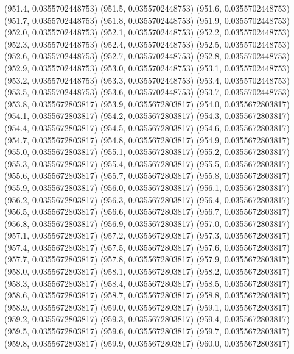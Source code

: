 {					(951.4, 0.0355702448753)
					(951.5, 0.0355702448753)
					(951.6, 0.0355702448753)
					(951.7, 0.0355702448753)
					(951.8, 0.0355702448753)
					(951.9, 0.0355702448753)
					(952.0, 0.0355702448753)
					(952.1, 0.0355702448753)
					(952.2, 0.0355702448753)
					(952.3, 0.0355702448753)
					(952.4, 0.0355702448753)
					(952.5, 0.0355702448753)
					(952.6, 0.0355702448753)
					(952.7, 0.0355702448753)
					(952.8, 0.0355702448753)
					(952.9, 0.0355702448753)
					(953.0, 0.0355702448753)
					(953.1, 0.0355702448753)
					(953.2, 0.0355702448753)
					(953.3, 0.0355702448753)
					(953.4, 0.0355702448753)
					(953.5, 0.0355702448753)
					(953.6, 0.0355702448753)
					(953.7, 0.0355702448753)
					(953.8, 0.0355672803817)
					(953.9, 0.0355672803817)
					(954.0, 0.0355672803817)
					(954.1, 0.0355672803817)
					(954.2, 0.0355672803817)
					(954.3, 0.0355672803817)
					(954.4, 0.0355672803817)
					(954.5, 0.0355672803817)
					(954.6, 0.0355672803817)
					(954.7, 0.0355672803817)
					(954.8, 0.0355672803817)
					(954.9, 0.0355672803817)
					(955.0, 0.0355672803817)
					(955.1, 0.0355672803817)
					(955.2, 0.0355672803817)
					(955.3, 0.0355672803817)
					(955.4, 0.0355672803817)
					(955.5, 0.0355672803817)
					(955.6, 0.0355672803817)
					(955.7, 0.0355672803817)
					(955.8, 0.0355672803817)
					(955.9, 0.0355672803817)
					(956.0, 0.0355672803817)
					(956.1, 0.0355672803817)
					(956.2, 0.0355672803817)
					(956.3, 0.0355672803817)
					(956.4, 0.0355672803817)
					(956.5, 0.0355672803817)
					(956.6, 0.0355672803817)
					(956.7, 0.0355672803817)
					(956.8, 0.0355672803817)
					(956.9, 0.0355672803817)
					(957.0, 0.0355672803817)
					(957.1, 0.0355672803817)
					(957.2, 0.0355672803817)
					(957.3, 0.0355672803817)
					(957.4, 0.0355672803817)
					(957.5, 0.0355672803817)
					(957.6, 0.0355672803817)
					(957.7, 0.0355672803817)
					(957.8, 0.0355672803817)
					(957.9, 0.0355672803817)
					(958.0, 0.0355672803817)
					(958.1, 0.0355672803817)
					(958.2, 0.0355672803817)
					(958.3, 0.0355672803817)
					(958.4, 0.0355672803817)
					(958.5, 0.0355672803817)
					(958.6, 0.0355672803817)
					(958.7, 0.0355672803817)
					(958.8, 0.0355672803817)
					(958.9, 0.0355672803817)
					(959.0, 0.0355672803817)
					(959.1, 0.0355672803817)
					(959.2, 0.0355672803817)
					(959.3, 0.0355672803817)
					(959.4, 0.0355672803817)
					(959.5, 0.0355672803817)
					(959.6, 0.0355672803817)
					(959.7, 0.0355672803817)
					(959.8, 0.0355672803817)
					(959.9, 0.0355672803817)
					(960.0, 0.0355672803817)
}
